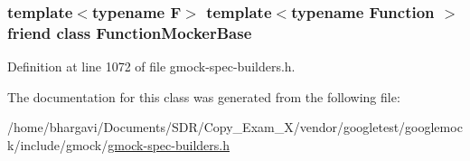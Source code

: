 \subsubsection[{\texorpdfstring{Function\+Mocker\+Base}{FunctionMockerBase}}]{\setlength{\rightskip}{0pt plus 5cm}template$<$typename F$>$ template$<$typename Function $>$ friend class {\bf Function\+Mocker\+Base}\hspace{0.3cm}{\ttfamily [friend]}}\hypertarget{classtesting_1_1internal_1_1_typed_expectation_a1771ea4a3d92d8b2ff0f0aa6fc40ff55}{}\label{classtesting_1_1internal_1_1_typed_expectation_a1771ea4a3d92d8b2ff0f0aa6fc40ff55}


Definition at line 1072 of file gmock-\/spec-\/builders.\+h.



The documentation for this class was generated from the following file\+:\begin{DoxyCompactItemize}
\item 
/home/bhargavi/\+Documents/\+S\+D\+R/\+Copy\+\_\+\+Exam\+\_\+X/vendor/googletest/googlemock/include/gmock/\hyperlink{gmock-spec-builders_8h}{gmock-\/spec-\/builders.\+h}\end{DoxyCompactItemize}
